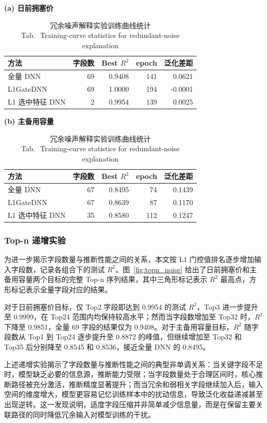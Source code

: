 \documentclass[UTF8,zihao=5,twoside]{ctexart}
\numberwithin{equation}{section}
\newcommand{\tabbicaption}[2]{%
  \caption{#1\\[-0.2em]\small Tab.\,\thetable\ #2}
}
\begin{document}
\begin{table}[!tbp]
\centering
\scriptsize
\setlength{\tabcolsep}{3pt}
\tabbicaption{冗余噪声解释实验训练曲线统计}{Training-curve statistics for redundant-noise explanation}
\label{tab:noise_curve}
\textbf{(a) 日前拥塞价}\\[-0.2em]
\begin{tabularx}{\columnwidth}{Xrrrr}
\toprule
方法 & 字段数 & Best $R^2$ & epoch & 泛化差距 \\
\midrule
全量 DNN & 69 & 0.9408 & 141 & 0.0621 \\
L1GateDNN & 69 & 1.0000 & 194 & -0.0001 \\
L1 选中特征 DNN & 2 & 0.9954 & 139 & 0.0025 \\
\bottomrule
\end{tabularx}

\vspace{0.4em}
\textbf{(b) 主备用容量}\\[-0.2em]
\begin{tabularx}{\columnwidth}{Xrrrr}
\toprule
方法 & 字段数 & Best $R^2$ & epoch & 泛化差距 \\
\midrule
全量 DNN & 67 & 0.8495 & 74 & 0.1439 \\
L1GateDNN & 67 & 0.8639 & 87 & 0.1170 \\
L1 选中特征 DNN & 35 & 0.8580 & 112 & 0.1247 \\
\bottomrule
\end{tabularx}
\end{table}

\subsubsection{Top-n 递增实验}
为进一步揭示字段数量与推断性能之间的关系，本文按 L1 门控值排名逐步增加输入字段数，记录各组合下的测试 $R^2$。图~\ref{fig:topn_noise} 给出了日前拥塞价和主备用容量两个目标的完整 Top-n 序列结果，其中三角形标记表示 $R^2$ 最高点，方形标记表示全量字段对应的结果。

对于日前拥塞价目标，仅 Top2 字段即达到 0.9954 的测试 $R^2$，Top3 进一步提升至 0.9999，在 Top24 范围内均保持较高水平；然而当字段数增加至 Top32 时，$R^2$ 下降至 0.9851，全量 69 字段的结果仅为 0.9408。对于主备用容量目标，$R^2$ 随字段数从 Top1 到 Top24 逐步提升至 0.8872 的峰值，但继续增加至 Top32 和 Top35 后分别降至 0.8545 和 0.8536，接近全量 DNN 的 0.8495。

上述递增实验揭示了字段数量与推断性能之间的典型非单调关系：当关键字段不足时，模型缺乏必要的信息源，推断能力受限；当字段数量处于合理区间时，核心推断路径被充分激活，推断精度显著提升；而当冗余和弱相关字段继续加入后，输入空间的维度增大，模型更容易记忆训练样本中的扰动信息，导致泛化收益递减甚至出现逆转。这一发现说明，适度字段压缩并非简单减少信息量，而是在保留主要关联路径的同时降低冗余输入对模型训练的干扰。
\end{document}
